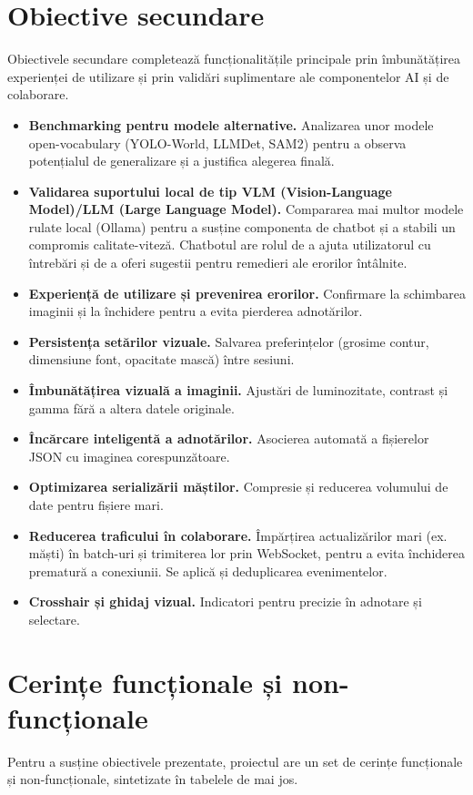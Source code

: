 \section{Obiective secundare}
Obiectivele secundare completează funcționalitățile principale prin îmbunătățirea experienței de utilizare și prin validări suplimentare ale componentelor AI și de colaborare.

\begin{itemize}
	\item \textbf{Benchmarking pentru modele alternative.} Analizarea unor modele open-vocabulary (YOLO-World, LLMDet, SAM2) pentru a observa potențialul de generalizare și a justifica alegerea finală.
	\item \textbf{Validarea suportului local de tip VLM (Vision-Language Model)/LLM (Large Language Model).} Compararea mai multor modele rulate local (Ollama) pentru a susține componenta de chatbot și a stabili un compromis calitate-viteză. Chatbotul are rolul de a ajuta utilizatorul cu întrebări și de a oferi sugestii pentru remedieri ale erorilor întâlnite.
	\item \textbf{Experiență de utilizare și prevenirea erorilor.} Confirmare la schimbarea imaginii și la închidere pentru a evita pierderea adnotărilor.
	\item \textbf{Persistența setărilor vizuale.} Salvarea preferințelor (grosime contur, dimensiune font, opacitate mască) între sesiuni.
	\item \textbf{Îmbunătățirea vizuală a imaginii.} Ajustări de luminozitate, contrast și gamma fără a altera datele originale.
	\item \textbf{Încărcare inteligentă a adnotărilor.} Asocierea automată a fișierelor JSON cu imaginea corespunzătoare.
	\item \textbf{Optimizarea serializării măștilor.} Compresie și reducerea volumului de date pentru fișiere mari.
	\item \textbf{Reducerea traficului în colaborare.} Împărțirea actualizărilor mari (ex. măști) în batch-uri și trimiterea lor prin WebSocket, pentru a evita închiderea prematură a conexiunii. Se aplică și deduplicarea evenimentelor.
	\item \textbf{Crosshair și ghidaj vizual.} Indicatori pentru precizie în adnotare și selectare.
\end{itemize}

\newpage

\section{Cerințe funcționale și non-funcționale}
Pentru a susține obiectivele prezentate, proiectul are un set de cerințe funcționale și non-funcționale, sintetizate în tabelele de mai jos.

